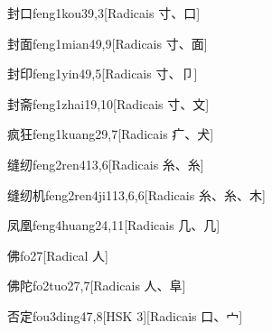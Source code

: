 \begin{entry}{封口}{feng1kou3}{9,3}[Radicais ⼨、⼝]
\end{entry}

\begin{entry}{封面}{feng1mian4}{9,9}[Radicais ⼨、⾯]
\end{entry}

\begin{entry}{封印}{feng1yin4}{9,5}[Radicais ⼨、⼙]
\end{entry}

\begin{entry}{封斋}{feng1zhai1}{9,10}[Radicais ⼨、⽂]
\end{entry}

\begin{entry}{疯狂}{feng1kuang2}{9,7}[Radicais ⽧、⽝]
\end{entry}

\begin{entry}{缝纫}{feng2ren4}{13,6}[Radicais ⽷、⽷]
\end{entry}

\begin{entry}{缝纫机}{feng2ren4ji1}{13,6,6}[Radicais ⽷、⽷、⽊]
\end{entry}

\begin{entry}{凤凰}{feng4huang2}{4,11}[Radicais ⼏、⼏]
\end{entry}

\begin{entry}{佛}{fo2}{7}[Radical ⼈]
\end{entry}

\begin{entry}{佛陀}{fo2tuo2}{7,7}[Radicais ⼈、⾩]
\end{entry}

\begin{entry}{否定}{fou3ding4}{7,8}[HSK 3][Radicais ⼝、⼧]
\end{entry}

